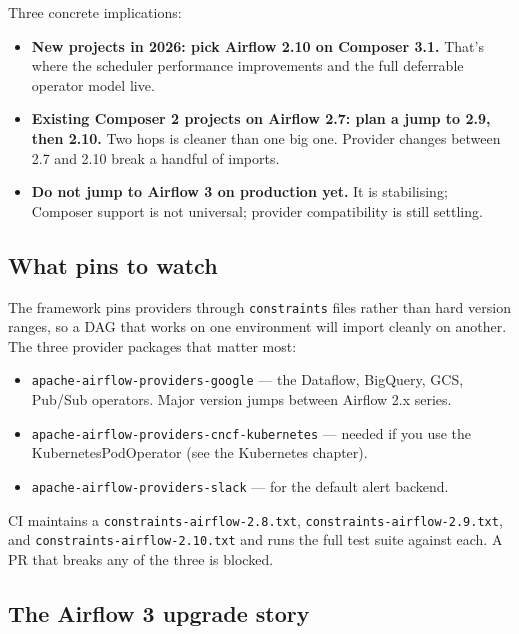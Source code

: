 \documentclass[
  11pt,
  british,
  oneside]{book}
\providecommand{\tightlist}{%
  \setlength{\itemsep}{0pt}\setlength{\parskip}{0pt}}
\begin{document}
Three concrete implications:

\begin{itemize}
\tightlist
\item
  \textbf{New projects in 2026: pick Airflow 2.10 on Composer 3.1.}
  That's where the scheduler performance improvements and the full
  deferrable operator model live.
\item
  \textbf{Existing Composer 2 projects on Airflow 2.7: plan a jump to
  2.9, then 2.10.} Two hops is cleaner than one big one. Provider
  changes between 2.7 and 2.10 break a handful of imports.
\item
  \textbf{Do not jump to Airflow 3 on production yet.} It is
  stabilising; Composer support is not universal; provider compatibility
  is still settling.
\end{itemize}

\hypertarget{what-pins-to-watch}{%
\subsection{What pins to watch}\label{what-pins-to-watch}}

The framework pins providers through \texttt{constraints} files rather
than hard version ranges, so a DAG that works on one environment will
import cleanly on another. The three provider packages that matter most:

\begin{itemize}
\tightlist
\item
  \texttt{apache-airflow-providers-google} --- the Dataflow, BigQuery,
  GCS, Pub/Sub operators. Major version jumps between Airflow 2.x
  series.
\item
  \texttt{apache-airflow-providers-cncf-kubernetes} --- needed if you
  use the KubernetesPodOperator (see the Kubernetes chapter).
\item
  \texttt{apache-airflow-providers-slack} --- for the default alert
  backend.
\end{itemize}

CI maintains a \texttt{constraints-airflow-2.8.txt},
\texttt{constraints-airflow-2.9.txt}, and
\texttt{constraints-airflow-2.10.txt} and runs the full test suite
against each. A PR that breaks any of the three is blocked.

\hypertarget{the-airflow-3-upgrade-story}{%
\subsection{The Airflow 3 upgrade
story}\label{the-airflow-3-upgrade-story}}
\end{document}
